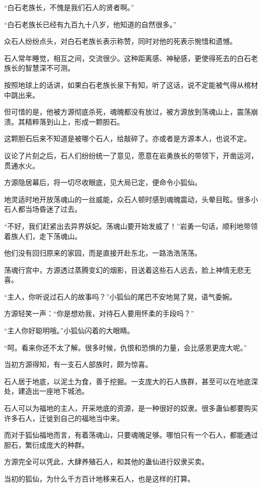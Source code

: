 \begin{this_body}
“白石老族长，不愧是我们石人的贤者啊。”

“白石老族长已经有九百九十八岁，他知道的自然很多。”

众石人纷纷点头，对白石老族长表示称赞，同时对他的死表示惋惜和遗憾。

石人常年睡觉，相互之间，交流很少。这种距离感、神秘感，更使得死去的白石老族长的智慧深不可测。

按照地球上的话讲，如果白石老族长泉下有知，听了这话，说不定能被气得从棺材中跳出来。

但可惜的是，他被方源彻底杀死，魂魄都没有放过，被方源放到荡魂山上，震荡崩溃。其精粹落到山上，形成一颗胆石。

这颗胆石后来不知道是被哪个石人，给敲碎了。亦或者是方源本人，也说不定。

议论了片刻之后，石人们纷纷统一了意见，愿意在岩勇族长的带领下，开凿运河，贯通水火。

方源隐居幕后，将一切尽收眼底，见大局已定，便命令小狐仙。

地灵适时地开放荡魂山的一丝威能，众石人顿时感到魂魄震动，头晕目眩。很多小石人都当场昏迷了过去。

“不好，我们赶紧出去异界妖妃。荡魂山要开始发威了！”岩勇一句话，顺利地带领着族人们，走下荡魂山。

他们没有回归原来的家园，而是直接开赴东北，一路浩浩荡荡。

荡魂行宫中，方源透过蒸腾变幻的烟影，目送着这些石人远去，脸上神情无悲无喜。

“主人，你听说过石人的故事吗？”小狐仙的尾巴不安地晃了晃，语气委婉。

方源轻笑一声：“你是想劝我，对待石人要用怀柔的手段吗？”

“主人你好聪明哦。”小狐仙闪着的大眼睛。

“呵。看来你还不太了解。很多时候，仇恨和恐惧的力量，会比感恩更庞大呢。”

当初方源得知，有一支石人部族时，颇为惊喜。

石人居于地底，以泥土为食，善于挖掘。一支庞大的石人族群，甚至可以在地底深处，建造出一座地下城池。

石人可以为福地的主人，开采地底的资源，是一种很好的奴隶。很多蛊仙都要购买许多石人，迁徙到自己的福地当中来。

而对于狐仙福地而言，有着荡魂山，只要魂魄足够。哪怕只有一个石人，都能通过胆石，繁衍成庞大的种群。

方源完全可以凭此，大肆养殖石人，和其他的蛊仙进行奴隶买卖。

当初的狐仙，为什么千方百计地移来石人，也是这样的打算。


\end{this_body}
